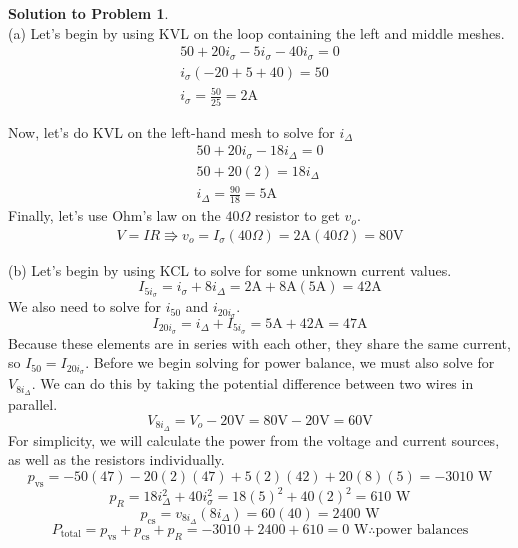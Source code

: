 \documentclass[11pt,letterpaper]{article}
\theoremstyle{definition}
\newtheorem{solprob}{\textcolor{solproblemcolor}{Solution to Problem}}  %
\begin{document}
\begin{solprob} \text{}\\
    (a) Let's begin by using KVL on the loop containing the left and middle meshes.
    \begin{gather}
        50 + 20i_\sigma - 5i_\sigma - 40i_\sigma = 0\\
        i_\sigma(-20 + 5 + 40) = 50\\
        i_\sigma=\frac{50}{25} = 2\text{A}
    \end{gather}

    Now, let's do KVL on the left-hand mesh to solve for $i_\Delta$
    \begin{gather}
        50 + 20i_\sigma - 18i_\Delta = 0\\
        50 + 20(2) = 18i_\Delta\\
        i_\Delta = \frac{90}{18} = 5\text{A}
    \end{gather}
    Finally, let's use Ohm's law on the $40\Omega$ resistor to get $v_o$.
    \begin{gather}
        V = IR \Rrightarrow v_o = I_\sigma(40\Omega) = 2\text{A}(40\Omega) = 80\text{V}
    \end{gather}

    (b)
    Let's begin by using KCL to solve for some unknown current values.
    \[I_\text{$5i_\sigma$} = i_\sigma + 8i_\Delta = 2\text{A} + 8\text{A}(5\text{A}) = 42\text{A}\]
    We also need to solve for $i_\text{50}$ and $i_\text{$20i_\sigma$}$.
    \[I_\text{$20i_\sigma$} = i_\Delta + I_\text{$5i_\sigma$} = 5\text{A} + 42\text{A} = 47\text{A}\]
    Because these elements are in series with each other, they share the same current, so $I_\text{50} = I_\text{$20i_\sigma$}$. Before we begin solving for power balance, we must also solve for $V_\text{$8i_\Delta$}$. We can do this by taking the potential difference between two wires in parallel.
    \[V_\text{$8i_\Delta$} = V_o - 20\text{V} = 80\text{V} - 20\text{V} = 60\text{V}\]
    For simplicity, we will calculate the power from the voltage and current sources, as well as the resistors individually.
    \[p_\text{vs} = -50(47)-20(2)(47) + 5(2)(42) + 20(8)(5) = -3010 \text{ W}\]
    \[p_R = 18i^2_\Delta + 40i^2_\sigma = 18(5)^2 + 40(2)^2 = 610 \text{ W}\]
    \[p_\text{cs} = v_\text{$8i_\Delta$}(8i_\Delta) = 60(40) = 2400 \text{ W}\]
    \[P_\text{total} = p_\text{vs} + p_\text{cs} + p_R = -3010 + 2400 + 610 = 0\text{ W} \therefore \text{power balances}\]
\end{solprob}

\noindent\makebox[\linewidth]{\color{rouge_poly}{\rule{\textwidth}{1.3pt}}}	
\end{document}
